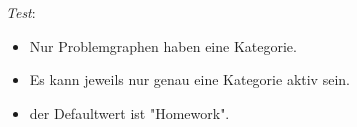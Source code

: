 \emph{Test}:
\begin{itemize}
\item Nur Problemgraphen haben eine Kategorie.
\item Es kann jeweils nur genau eine Kategorie aktiv sein.
\item der Defaultwert ist "Homework".
\end{itemize}